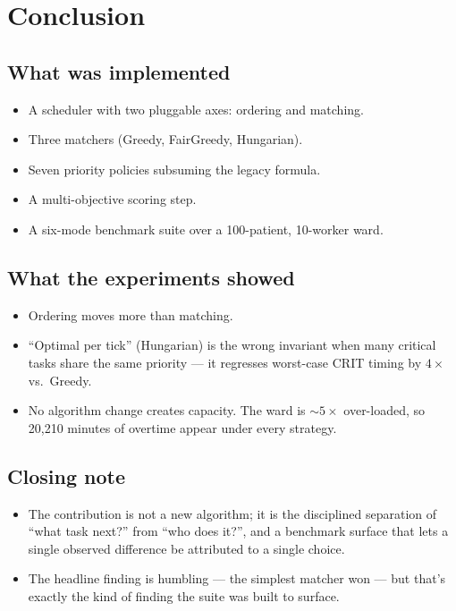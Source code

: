 \section{Conclusion}
\label{sec:conclusion}

\subsection{What was implemented}

\begin{itemize}
  \item A scheduler with two pluggable axes: ordering and
        matching.
  \item Three matchers (Greedy, FairGreedy, Hungarian).
  \item Seven priority policies subsuming the legacy formula.
  \item A multi-objective scoring step.
  \item A six-mode benchmark suite over a 100-patient,
        10-worker ward.
\end{itemize}

\subsection{What the experiments showed}

\begin{itemize}
  \item Ordering moves more than matching.
  \item ``Optimal per tick'' (Hungarian) is the wrong invariant
        when many critical tasks share the same priority --- it
        regresses worst-case CRIT timing by $4\times$ vs.\ Greedy.
  \item No algorithm change creates capacity. The ward is
        $\sim 5\times$ over-loaded, so 20{,}210 minutes of overtime
        appear under every strategy.
\end{itemize}

\subsection{Closing note}

\begin{itemize}
  \item The contribution is not a new algorithm; it is the
        disciplined separation of ``what task next?'' from
        ``who does it?'', and a benchmark surface that lets a
        single observed difference be attributed to a single
        choice.
  \item The headline finding is humbling --- the simplest matcher
        won --- but that's exactly the kind of finding the suite
        was built to surface.
\end{itemize}
